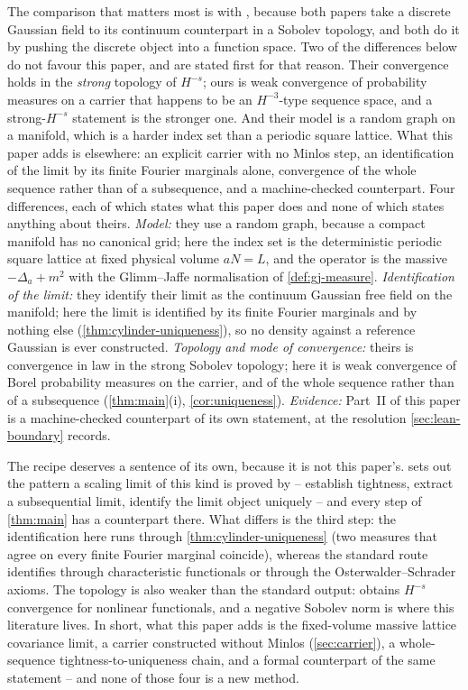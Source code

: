 The comparison that matters most is with \cite{cipriani2020}, because both
papers take a discrete Gaussian field to its continuum counterpart in a Sobolev
topology, and both do it by pushing the discrete object into a function space.
Two of the differences below do not favour this paper, and are stated first for
that reason.  Their convergence holds in the \emph{strong} topology of $H^{-s}$;
ours is weak convergence of probability measures on a carrier that happens to be
an $H^{-3}$-type sequence space, and a strong-$H^{-s}$ statement is the stronger
one.  And their model is a random graph on a manifold, which is a harder index
set than a periodic square lattice.  What this paper adds is elsewhere: an
explicit carrier with no Minlos step, an identification of the limit by its
finite Fourier marginals alone, convergence of the whole sequence rather than of
a subsequence, and a machine-checked counterpart.
Four differences, each of which states what this paper does and none of which
states anything about theirs.  \emph{Model:} they use a random graph, because a
compact manifold has no canonical grid; here the index set is the deterministic
periodic square lattice at fixed physical volume $aN=L$, and the operator is the
massive $-\Delta_a+m^2$ with the Glimm--Jaffe normalisation of
\cref{def:gj-measure}.  \emph{Identification of the limit:} they identify their
limit as the continuum Gaussian free field on the manifold; here the limit is
identified by its finite Fourier marginals and by nothing else
(\cref{thm:cylinder-uniqueness}), so no density against a reference Gaussian is
ever constructed.  \emph{Topology and mode of convergence:} theirs is
convergence in law in the strong Sobolev topology; here it is weak convergence of
Borel probability measures on the carrier, and of the whole sequence rather than
of a subsequence (\cref{thm:main}(i), \cref{cor:uniqueness}).  \emph{Evidence:}
Part~II of this paper is a machine-checked counterpart of its own statement, at
the resolution \cref{sec:lean-boundary} records.

The recipe deserves a sentence of its own, because it is not this paper's.
\cite{biskup2020} sets out the pattern a scaling limit of this kind is proved by
-- establish tightness, extract a subsequential limit, identify the limit object
uniquely -- and every step of \cref{thm:main} has a counterpart there.  What
differs is the third step: the identification here runs through
\cref{thm:cylinder-uniqueness} (two measures that agree on every finite Fourier
marginal coincide), whereas the standard route identifies through
characteristic functionals or through the Osterwalder--Schrader axioms.  The
topology is also weaker than the standard output: \cite{peter2026} obtains
$H^{-s}$ convergence for nonlinear functionals, and a negative Sobolev norm is
where this literature lives.  In short, what this paper adds is the fixed-volume
massive lattice covariance limit, a carrier constructed without Minlos
(\cref{sec:carrier}), a whole-sequence tightness-to-uniqueness chain, and a
formal counterpart of the same statement -- and none of those four is a new
method.

